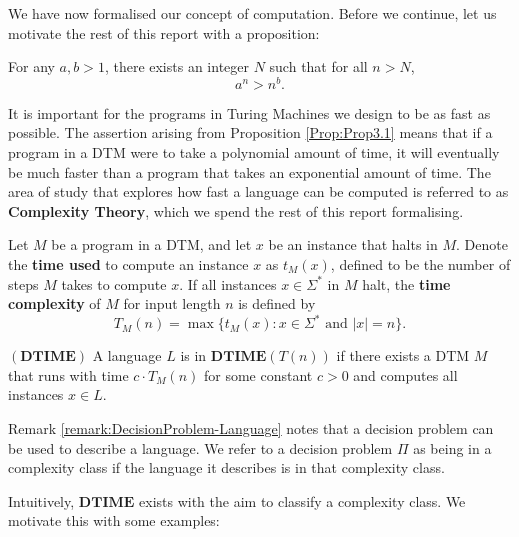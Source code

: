 We have now formalised our concept of computation. Before we continue, let us motivate the rest of this report with a proposition:

\begin{proposition}\label{Prop:Prop3.1}
    For any $a,b>1$, there exists an integer $N$ such that for all $n > N$,
    \[
    a^n > n^b \text{.}
    \]
\end{proposition}



It is important for the programs in Turing Machines we design to be as fast as possible. The assertion arising from Proposition \ref{Prop:Prop3.1} means that if a program in a DTM were to take a polynomial amount of time, it will eventually be much faster than a program that takes an exponential amount of time. The area of study that explores how fast a language can be computed is referred to as \textbf{Complexity Theory}, which we spend the rest of this report formalising.

\begin{definition}
    Let $M$ be a program in a DTM, and let $x$ be an instance that halts in $M$. Denote the \textbf{time used} to compute an instance $x$ as $t_M(x)$, defined to be the number of steps $M$ takes to compute $x$. If all instances $x \in \Sigma^*$ in $M$ halt, the \textbf{time complexity} of $M$ for input length $n$ is defined by
    \begin{equation*}
        T_M(n) = \max\{t_M(x):x \in \Sigma^* \text{ and } |x| = n\}\text{.}
    \end{equation*}
\end{definition}

\begin{definition}\label{def:DTIME}
    $(\mathbf{DTIME})$ A language $L$ is in $\mathbf{DTIME}(T(n))$ if there exists a DTM $M$ that runs with time $c \cdot T_M(n)$ for some constant $c>0$ and computes all instances $x \in L$.
\end{definition}

\begin{remark}
    Remark \ref{remark:DecisionProblem-Language} notes that a decision problem can be used to describe a language. We refer to a decision problem $\Pi$ as being in a complexity class if the language it describes is in that complexity class.
\end{remark}

Intuitively, $\mathbf{DTIME}$ exists with the aim to classify a complexity class. We motivate this with some examples:

